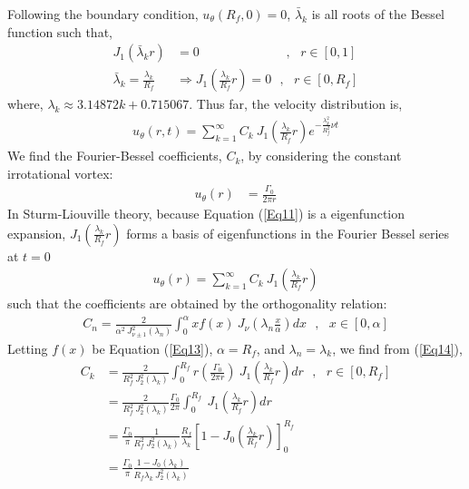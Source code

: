 \documentclass{article}
\begin{document}
Following the boundary condition, $u_\theta (R_f,0)=0$, $\bar{\lambda}_k$ is all roots of the Bessel function such that,
\begin{align*}
    J_1\left(\bar{\lambda}_k r \right) &=0 \:\:\:\:\:\:\:\:\:\:\:\:\:\:\:\:\:\:\:\:\:\:\:\:\:\:\:\:\:\:\:,\:\:\: r\in [0,1]\\
    \bar{\lambda}_k= \frac{\lambda_k}{R_f} &\Rightarrow  J_1\left(\frac{\lambda_k}{R_f}r \right)=0 \:\:\:,\:\:\: r\in [0,R_f]
\end{align*}
where, $\lambda_k \approx 3.14872k+0.715067$. Thus far, the velocity distribution is,
\begin{align}\label{Eq12}
    u_\theta (r,t)= \sum_{k=1}^{\infty} C_k \: J_1\left(\frac{\lambda_k}{R_f}r \right) e^{-\frac{\lambda_k^2}{R_f^2} \nu t}
\end{align}
We find the Fourier-Bessel coefficients, $C_k$, by considering the constant irrotational vortex:
\begin{align}\label{Eq13}
    u_\theta (r) &= \frac{\Gamma_0}{2\pi r}
\end{align}
In Sturm-Liouville theory, because Equation (\ref{Eq11}) is a eigenfunction expansion, $J_1\left(\frac{\lambda_k}{R_f}r \right)$ forms a basis of eigenfunctions in the Fourier Bessel series at $t=0$
\begin{align}\label{Eq14}
    u_\theta (r) = \sum_{k=1}^{\infty} C_k \: J_1\left(\frac{\lambda_k}{R_f}r \right)
\end{align}
such that the coefficients are obtained by the orthogonality relation:
\begin{align*}
    C_n = \frac{2}{\alpha^2 \: J_{\nu \pm 1}^2\left(\lambda_n\right)}\int_{0}^{\alpha} x f(x) \:J_\nu \left(\lambda_n \frac{x}{\alpha}\right)dx \:\:\:,\:\:\: x\in [0,\alpha]
\end{align*}
Letting $f(x)$ be Equation (\ref{Eq13}), $\alpha=R_f$, and $\lambda_n = \lambda_k$, we find from (\ref{Eq14}),
\begin{align*}
    C_k &= \frac{2}{R_f^2 \: J_{2}^2\left(\lambda_k\right)}\int_{0}^{R_f} r \left(\frac{\Gamma_0}{2\pi r} \right) \:J_1 \left(\frac{\lambda_k}{R_f}r\right)dr \:\:\:,\:\:\: r\in [0,R_f]\\
    &=\frac{2}{R_f^2 \: J_{2}^2\left(\lambda_k\right)} \frac{\Gamma_0}{2\pi} \int_{0}^{R_f} \:J_1 \left(\frac{\lambda_k}{R_f}r\right)dr\\
    &=\frac{\Gamma_0}{\pi}\frac{1}{R_f^2 \: J_{2}^2\left(\lambda_k\right)} \frac{R_f}{\lambda_k}\left[ 1-J_0 \left(\frac{\lambda_k}{R_f}r\right)  \right]_{0}^{R_f}\\
    &=\frac{\Gamma_0}{\pi}\frac{1-J_0 \left(\lambda_k\right)}{R_f \lambda_k\: J_{2}^2\left(\lambda_k\right)}
\end{align*}
\end{document}
